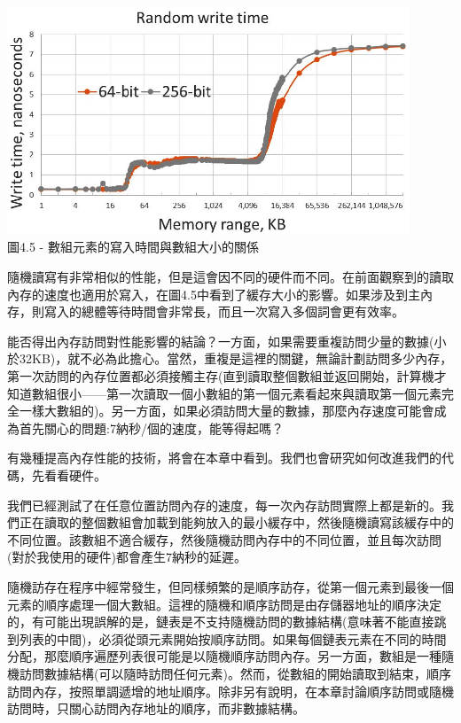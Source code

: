 \begin{center}
\includegraphics[width=0.9\textwidth]{content/1/chapter4/images/5.jpg}\\
圖4.5 - 數組元素的寫入時間與數組大小的關係
\end{center}

隨機讀寫有非常相似的性能，但是這會因不同的硬件而不同。在前面觀察到的讀取內存的速度也適用於寫入，在圖4.5中看到了緩存大小的影響。如果涉及到主內存，則寫入的總體等待時間會非常長，而且一次寫入多個詞會更有效率。

能否得出內存訪問對性能影響的結論？一方面，如果需要重複訪問少量的數據(小於32KB)，就不必為此擔心。當然，重複是這裡的關鍵，無論計劃訪問多少內存，第一次訪問的內存位置都必須接觸主存(直到讀取整個數組並返回開始，計算機才知道數組很小——第一次讀取一個小數組的第一個元素看起來與讀取第一個元素完全一樣大數組的)。另一方面，如果必須訪問大量的數據，那麼內存速度可能會成為首先關心的問題:7納秒/個的速度，能等得起嗎？

有幾種提高內存性能的技術，將會在本章中看到。我們也會研究如何改進我們的代碼，先看看硬件。


我們已經測試了在任意位置訪問內存的速度，每一次內存訪問實際上都是新的。我們正在讀取的整個數組會加載到能夠放入的最小緩存中，然後隨機讀寫該緩存中的不同位置。該數組不適合緩存，然後隨機訪問內存中的不同位置，並且每次訪問(對於我使用的硬件)都會產生7納秒的延遲。

隨機訪存在程序中經常發生，但同樣頻繁的是順序訪存，從第一個元素到最後一個元素的順序處理一個大數組。這裡的隨機和順序訪問是由存儲器地址的順序決定的，有可能出現誤解的是，鏈表是不支持隨機訪問的數據結構(意味著不能直接跳到列表的中間)，必須從頭元素開始按順序訪問。如果每個鏈表元素在不同的時間分配，那麼順序遍歷列表很可能是以隨機順序訪問內存。另一方面，數組是一種隨機訪問數據結構(可以隨時訪問任何元素)。然而，從數組的開始讀取到結束，順序訪問內存，按照單調遞增的地址順序。除非另有說明，在本章討論順序訪問或隨機訪問時，只關心訪問內存地址的順序，而非數據結構。

